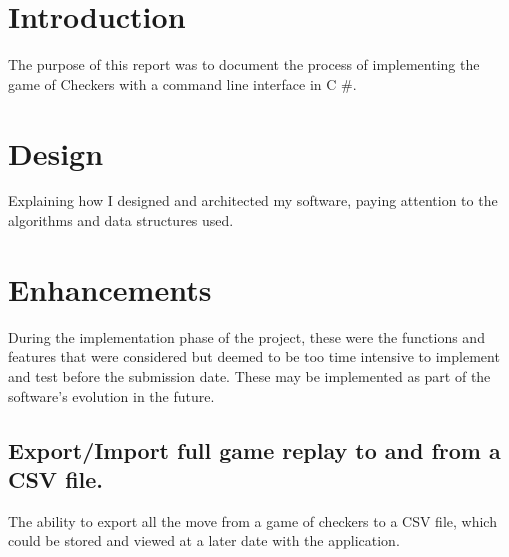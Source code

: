 \documentclass[10pt, a4paper]{article}
\title{\mytitle}
\author{\myauthor\hspace{1em}\\\contact\\Edinburgh Napier University\hspace{0.5em}-\hspace{0.5em}\mymodule}
\date{}
\begin{document}
	
    \maketitle  
    
    \begin{abstract}
    An abstract is a 100-200 word summary of your report. It provides a brief overview of the report by stating the purpose, defining the topic, summarising the main sections of the report, and stating the conclusion or outcomes. An abstract is usually written when you have completed the report.
    \end{abstract}


    
    
    
    \section{Introduction}
    The purpose of this report was to document the process of implementing the game of Checkers with a command line interface in C \#.
    
    
    
    
    \section{Design}
    Explaining how I designed and architected my software, paying attention to the algorithms and data structures used.
    
    
    
    
    \section{Enhancements}
    During the implementation phase of the project, these were the functions and features that were considered but deemed to be too time intensive to implement and test before the submission date. These may be implemented as part of the software's evolution in the future. 
    
    \subsection{Export/Import full game replay to and from a CSV file.}
    The ability to export all the move from a game of checkers to a CSV file, which could be stored and viewed at a later date with the application.
    
\end{document}

